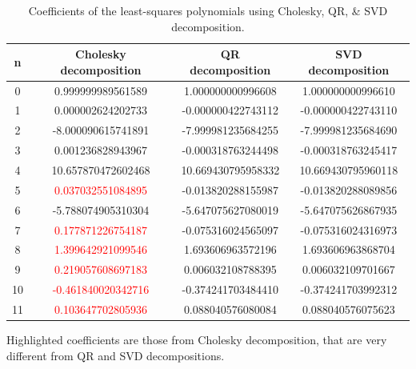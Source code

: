 \documentclass[a4paper,11pt]{article}
\begin{document}
\begin{center}
	\begin{table}[h!]
		\centering
		\setlength\extrarowheight{6pt}
		\begin{tabular}{ |c|c|c|c| }
			\hline
			\textbf{n} & \textbf{Cholesky decomposition} & \textbf{QR decomposition} & \textbf{SVD decomposition} \\
			\hline
			0 & 0.999999989561589 & 1.000000000996608 & 1.000000000996610 \\
			\hline
			1 & 0.000002624202733 & -0.000000422743112 & -0.000000422743110 \\
			\hline
			2 & -8.000090615741891 & -7.999981235684255 & -7.999981235684690 \\
			\hline
			3 & 0.001236828943967 & -0.000318763244498 & -0.000318763245417 \\
			\hline
			4 & 10.657870472602468 & 10.669430795958332 & 10.669430795960118 \\
			\hline
			5 & \textcolor{red}{0.037032551084895} & -0.013820288155987 & -0.013820288089856 \\
			\hline
			6 & -5.788074905310304 & -5.647075627080019 & -5.647075626867935 \\
			\hline
			7 & \textcolor{red}{0.177871226754187} & -0.075316024565097 & -0.075316024316973 \\
			\hline
			8 & \textcolor{red}{1.399642921099546} & 1.693606963572196 & 1.693606963868704 \\
			\hline
			9 & \textcolor{red}{0.219057608697183} & 0.006032108788395 & 0.006032109701667 \\
			\hline
			10 & \textcolor{red}{-0.461840020342716} & -0.374241703484410 & -0.374241703992312 \\
			\hline
			11 & \textcolor{red}{0.103647702805936} & 0.088040576080084 & 0.088040576075623 \\
			\hline
		\end{tabular}
		\caption*{Coefficients of the least-squares polynomials using Cholesky, QR, \& SVD decomposition.}
	\end{table}
\end{center}
Highlighted coefficients are those from Cholesky decomposition, that are very different from QR and SVD decompositions.
\newpage
\end{document}
